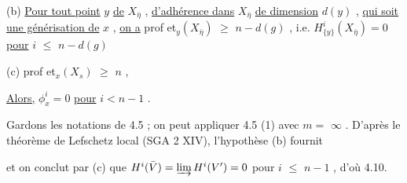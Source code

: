 (b) \underline{Pour tout point}  $y$  \underline{de}  $X_{\bar{\eta}}$  , \underline{d'adhérence dans}  $X_{\bar{\eta}}$  \underline{de dimension} $d(y)$ , \underline{qui soit une générisation de}  $x$ , \underline{on a}  prof et$_y(X_{\bar{\eta}})$ $\geqslant$ $n - d(g)$ ,  i.e. $H^i_{\{y\}}(X_{\bar{\eta}}) = 0$ \underline{pour}  $i$ $\leqslant$ $n - d(g)$

(c)  prof et$_x(X_s)$ $\geqslant$ $n$ ,

\underline{Alors,} $\phi^i_x = 0$ \underline{pour}  $i < n-1$ .

Gardons les notations de 4.5 ; on peut appliquer 4.5 (1) avec  $m =$ $\infty$ . D'après le théorème de Lefschetz local  (SGA 2 XIV), l'hypothèse (b) fournit

\begin{center}
\end{center}
et on conclut par (c) que  $H^i(\bar{V}) = \varinjlim H^i(V') = 0$  pour  $i$ $\leqslant$ $n-1$ , d'où 4.10.

